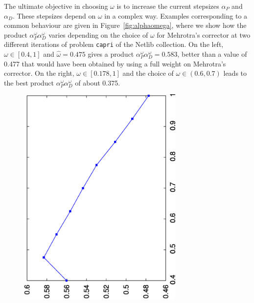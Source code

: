 The ultimate objective in choosing $\omega$ is to increase 
the current stepsizes 
$\alpha_P$ and $\alpha_D$. These stepsizes depend on $\omega$ 
in a complex way. Examples corresponding to a common behaviour 
are given in Figure~\ref{fig:alphaomega}, where we show how the
product $\alpha^\omega_P\alpha^\omega_D$
varies depending on the choice of $\omega$ for Mehrotra's corrector at 
two different iterations of problem {\tt capri} of the Netlib collection.
On the left, $\omega \in [0.4, 1]$ and $\hat\omega=0.475$ gives a product
$\alpha^\omega_P\alpha^\omega_D=0.583$, 
better than a value of 0.477 that would have
been obtained by using a full weight on Mehrotra's corrector.
On the right, $\omega \in [0.178, 1]$ and the choice of 
$\omega \in (0.6, 0.7)$ leads to the best 
product $\alpha^\omega_P\alpha^\omega_D$ of about 0.375.
%
\begin{figure}[ht]
\centering
  \begin{minipage}[t]{0.49\textwidth}
  \includegraphics[width=0.73\textwidth,angle=-90]{figures/alphaomega-1.eps}
  \end{minipage} 
  \hfill
  \begin{minipage}[t]{0.49\textwidth}

\end{minipage}
\end{figure}
